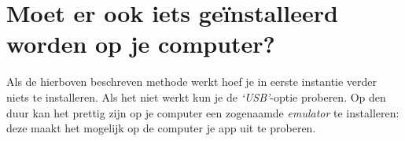 \section{Moet er ook iets ge\"installeerd worden op je computer?}
Als de hierboven beschreven methode werkt hoef je in eerste instantie verder niets te installeren. Als het niet werkt kun je de \emph{`USB'}-optie proberen. Op den duur kan het prettig zijn op je computer een zogenaamde \emph{emulator} te installeren: deze maakt het mogelijk op de computer je app uit te proberen. 



